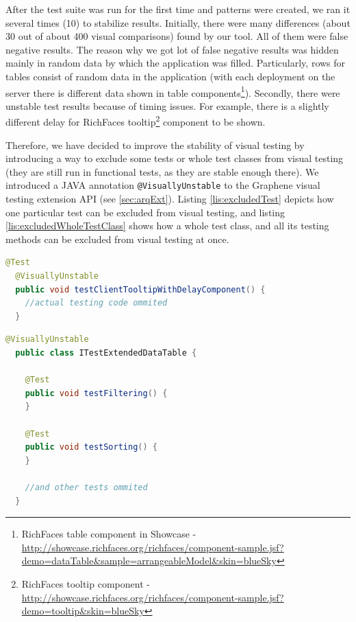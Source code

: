\documentclass[11pt,oneside,final]{fithesis2}
\begin{document}
  After the test suite was run for the first time and patterns were created, we ran it several times (10) to stabilize results. Initially, there
  were many differences (about 30 out of about 400 visual comparisons) found by our tool. All of them were false negative results. 
  The reason why we got lot of false negative results was hidden mainly in random data by which the application was filled. 
  Particularly, rows for tables consist of random data in the application (with each deployment on the server there is 
  different data shown in table 
  components\footnote{RichFaces table component in Showcase - 
  \url{http://showcase.richfaces.org/richfaces/component-sample.jsf?demo=dataTable&sample=arrangeableModel&skin=blueSky}}). 
  Secondly, there were unstable test results because of timing issues. For example, there is a slightly different delay for RichFaces
  tooltip\footnote{RichFaces tooltip component - 
  \url{http://showcase.richfaces.org/richfaces/component-sample.jsf?demo=tooltip&skin=blueSky}} component to be shown.
  
  Therefore, we have decided to improve the stability of visual testing by introducing a way to exclude some tests or whole
  test classes from visual testing (they are still run in functional tests, as they are stable enough there). We introduced
  a JAVA annotation \texttt{@VisuallyUnstable} to the Graphene visual testing extension API (see \ref{sec:arqExt}). 
  Listing \ref{lis:excludedTest} depicts how one particular test can be excluded from visual testing, 
  and listing \ref{lis:excludedWholeTestClass} shows how a whole test class, and all its testing methods can be excluded
  from visual testing at once.
  
  \begin{lstlisting}[caption=Exclude functional test from visual testing by annotating it with @VisuallyUnstable,label=lis:excludedTest,language=java]
  @Test
  @VisuallyUnstable
  public void testClientTooltipWithDelayComponent() {
    //actual testing code ommited
  }
  \end{lstlisting}

  \begin{lstlisting}[caption=Exclude whole test class from visual testing by annotating it with @VisuallyUnstable,label=lis:excludedWholeTestClass,language=java]
  @VisuallyUnstable
  public class ITestExtendedDataTable {
    
    @Test
    public void testFiltering() {
    }
    
    @Test
    public void testSorting() {
    }
    
    //and other tests ommited
  }
  \end{lstlisting}
  
\end{document}
